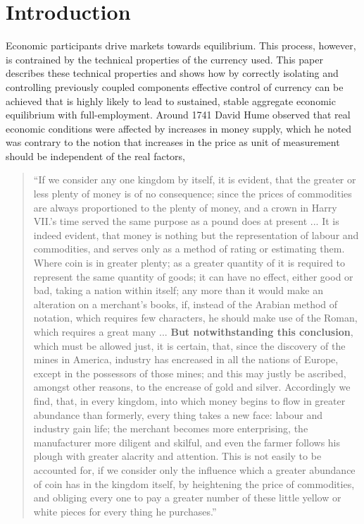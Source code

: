 \section{Introduction}

Economic participants drive markets towards equilibrium. This process, however, is contrained by the
technical properties of the currency used. This paper describes these technical properties and shows
how by correctly isolating and controlling previously coupled components effective control of
currency can be achieved that is highly likely to lead to sustained, stable aggregate economic
equilibrium with full-employment. Around 1741 David Hume\cite{hume1741} observed that real economic
conditions were affected by increases in money supply, which he noted was contrary to the notion
that increases in the price as unit of measurement should be independent of the real factors,

\begin{quotation}
\fontsize{8pt}{8pt}

``If we consider any one kingdom by itself, it is evident, that the greater or less plenty of money is
    of no consequence; since the prices of commodities are always proportioned to the plenty of
    money, and a crown in Harry VII.’s time served the same purpose as a pound does at present ...
    It is indeed evident, that money is nothing but the representation of labour and commodities,
    and serves only as a method of rating or estimating them. Where coin is in greater plenty; as a
    greater quantity of it is required to represent the same quantity of goods; it can have no
    effect, either good or bad, taking a nation within itself; any more than it would make an
    alteration on a merchant’s books, if, instead of the Arabian method of notation, which requires
    few characters, he should make use of the Roman, which requires a great many ... \textbf{But
    notwithstanding this conclusion}, which must be allowed just, it is certain, that, since the
    discovery of the mines in America, industry has encreased in all the nations of Europe, except
    in the possessors of those mines; and this may justly be ascribed, amongst other reasons, to the
    encrease of gold and silver.  Accordingly we find, that, in every kingdom, into which money
    begins to flow in greater abundance than formerly, every thing takes a new face: labour and
    industry gain life; the merchant becomes more enterprising, the manufacturer more diligent and
    skilful, and even the farmer follows his plough with greater alacrity and attention. This is not
    easily to be accounted for, if we consider only the influence which a greater abundance of coin
    has in the kingdom itself, by heightening the price of commodities, and obliging every one to
    pay a greater number of these little yellow or white pieces for every thing he purchases.''

\end{quotation}

